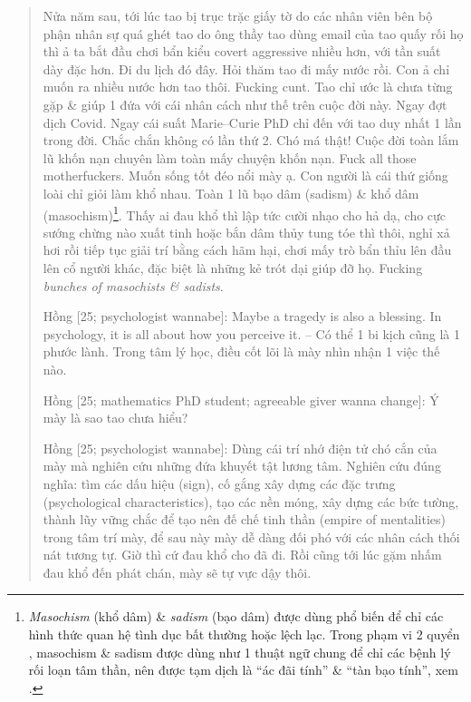 \documentclass[12pt,oneside]{book}
\begin{document}
\begin{quote}
	Nửa năm sau, tới lúc tao bị trục trặc giấy tờ do các nhân viên bên bộ phận nhân sự quá ghét tao do ông thầy tao dùng email của tao quấy rối họ thì ả ta bắt đầu chơi bẩn kiểu covert aggressive nhiều hơn, với tần suất dày đặc hơn. Đi du lịch đó đây. Hỏi thăm tao đi mấy nước rồi. Con ả chỉ muốn ra nhiều nước hơn tao thôi. Fucking cunt. Tao chỉ ước là chưa từng gặp \& giúp 1 đứa với cái nhân cách như thế trên cuộc đời này. Ngay đợt dịch Covid. Ngay cái suất Marie--Curie PhD chỉ đến với tao duy nhất 1 lần trong đời. Chắc chắn không có lần thứ 2. Chó má thật! Cuộc đời toàn lắm lũ khốn nạn chuyên làm toàn mấy chuyện khốn nạn. Fuck all those motherfuckers. Muốn sống tốt đéo nổi mày ạ. Con người là cái thứ giống loài chỉ giỏi làm khổ nhau. Toàn 1 lũ bạo dâm (sadism) \& khổ dâm (masochism)\footnote{{\it Masochism} (khổ dâm) \& {\it sadism} (bạo dâm) được dùng phổ biến để chỉ các hình thức quan hệ tình dục bất thường hoặc lệch lạc. Trong phạm vi 2 quyển \cite{Peck_road,Peck_road_VN}, masochism \& sadism được dùng như 1 thuật ngữ chung để chỉ các bệnh lý rối loạn tâm thần, nên được tạm dịch là ``ác đãi tính'' \& ``tàn bạo tính'', xem \cite[Chú thích, p. 121]{Peck_road_VN}.}. Thấy ai đau khổ thì lập tức cười nhạo cho hả dạ, cho cực sướng chừng nào xuất tinh hoặc bắn dâm thủy tung tóe thì thôi, nghỉ xả hơi rồi tiếp tục giải trí bằng cách hãm hại, chơi mấy trò bẩn thỉu lên đầu lên cổ người khác, đặc biệt là những kẻ trót dại giúp đỡ họ. Fucking {\it bunches of masochists \& sadists}.
	
	{\sf Hồng [25; psychologist wannabe]}: Maybe a tragedy is also a blessing. In psychology, it is all about how you perceive it. -- Có thể 1 bi kịch cũng là 1 phước lành. Trong tâm lý học, điều cốt lõi là mày nhìn nhận 1 việc thế nào.
	
	{\sf Hồng [25; mathematics PhD student; agreeable giver wanna change]}: Ý mày là sao tao chưa hiểu?
	
	{\sf Hồng [25; psychologist wannabe]}: Dùng cái trí nhớ điện tử chó cắn của mày mà nghiên cứu những đứa khuyết tật lương tâm. Nghiên cứu đúng nghĩa: tìm các dấu hiệu (sign), cố gắng xây dựng các đặc trưng (psychological characteristics), tạo các nền móng, xây dựng các bức tường, thành lũy vững chắc để tạo nên đế chế tinh thần (empire of mentalities) trong tâm trí mày, để sau này mày dễ dàng đối phó với các nhân cách thối nát tương tự. Giờ thì cứ đau khổ cho đã đi. Rồi cũng tới lúc gặm nhấm đau khổ đến phát chán, mày sẽ tự vực dậy thôi.
\end{quote}
\end{document}
